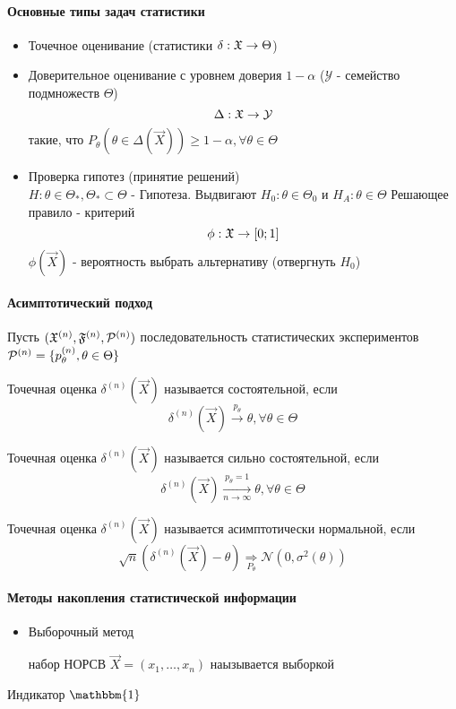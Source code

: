 \documentclass[main.tex]{subfiles}
\begin{document}
\paragraph{Основные типы задач статистики}
\begin{itemize}
	\item Точечное оценивание (статистики $\delta : \mathfrak{X} \rightarrow \Theta$)
	\item Доверительное оценивание с уровнем доверия $1-\alpha$ ($\mathcal{Y}$ - семейство подмножеств $\Theta$)
		$$\Delta : \mathfrak{X} \rightarrow \mathcal{Y}$$
	такие, что $P_\theta (\theta \in \Delta (\vec{X})) \geq 1-\alpha, \forall \theta \in \Theta$
	\item Проверка гипотез (принятие решений) \\
	$H:\theta \in \Theta_*, \Theta_* \subset \Theta$ - Гипотеза. Выдвигают $H_0 : \theta \in \Theta_0$ и $H_A : \theta \in \Theta$ Решающее правило - критерий
	$$\phi : \mathfrak{X} \rightarrow [0;1]$$
	$\phi(\vec{X})$ - вероятность выбрать альтернативу (отвергнуть $H_0$)
\end{itemize}

\paragraph{Асимптотический подход}
Пусть $(\mathfrak{X}^{(n)},\mathfrak{F}^{(n)},\mathcal{P}^{(n)})$ последовательность статистических экспериментов
$\mathcal{P}^{(n)}=\{p_\theta^{(n)},\theta \in \Theta\}$

\begin{definition}
	 Точечная оценка $\delta^{(n)}(\vec{X})$ называется состоятельной, если
	 $$\delta^{(n)}(\vec{X}) \xrightarrow{p_\theta} \theta,\forall \theta \in \Theta $$
\end{definition}
 
\begin{definition}
	Точечная оценка $\delta^{(n)}(\vec{X})$ называется сильно состоятельной, если
	 $$\delta^{(n)}(\vec{X}) \xrightarrow[n \rightarrow \infty]{p_\theta = 1} \theta,\forall \theta \in \Theta $$
\end{definition}

\begin{definition}
	Точечная оценка $\delta^{(n)}(\vec{X})$ называется асимптотически нормальной, если
	$$\sqrt{n} (\delta^{(n)}(\vec{X}) - \theta) \underset{P_\theta}{\Rightarrow} \mathcal{N}(0,\sigma^2(\theta))$$
\end{definition}

\paragraph{Методы накопления статистической информации}
\begin{itemize}
	\item Выборочный метод
	\begin{definition}[Выборка]
		набор НОРСВ $\vec{X}=(x_1,\dots,x_n)$ наызывается выборкой
	\end{definition}

\end{itemize}

Индикатор $\mathbbm{1}$
\end{document}
